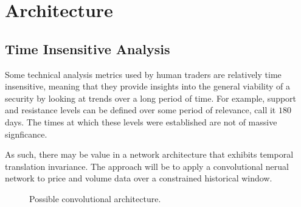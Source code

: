 \documentclass{article}
\begin{document}
\section{Architecture}

\subsection{Time Insensitive Analysis}

Some technical analysis metrics used by human traders are relatively
time insensitive, meaning that they provide insights into the general
viability of a security by looking at trends over a long period of
time. For example, support and resistance levels can be defined over
some period of relevance, call it $180$ days. The times at which these
levels were established are not of massive signficance.
\newline

As such, there may be value in a network architecture that exhibits
temporal translation invariance. The approach will be to apply a
convolutional nerual network to price and volume data over a
constrained historical window.

\begin{figure}[h]
	\centering
	
	\caption{Possible convolutional architecture.}
	\label{fig:cnn}
\end{figure}
\end{document}
